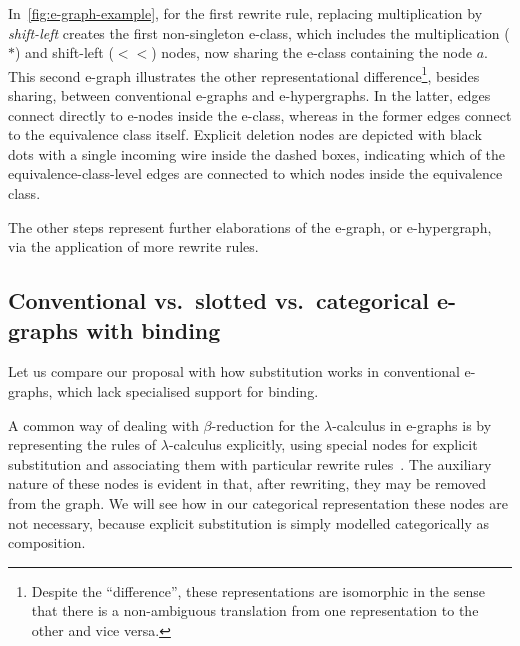 In~\autoref{fig:e-graph-example}, for the first rewrite rule, replacing multiplication by \emph{shift-left} creates the first non-singleton e-class, which includes the multiplication ($*$) and shift-left ($<\!\!<$) nodes, now sharing the e-class containing the node $a$.
This second e-graph illustrates the other representational difference\footnote{Despite the \enquote{difference}, these representations are isomorphic in the sense that there is a non-ambiguous translation from one representation to the other and vice versa.}, besides sharing, between conventional e-graphs and e-hypergraphs.
In the latter, edges connect directly to e-nodes inside the e-class, whereas in the former edges connect to the equivalence class itself.
Explicit deletion nodes are depicted with black dots with a single incoming wire
inside the dashed boxes, indicating which of the equivalence-class-level edges are connected to which nodes inside the equivalence class.

The other steps represent further elaborations of the e-graph, or e-hypergraph, via the application of more rewrite rules.

\subsection{Conventional vs.\ slotted vs.\ categorical e-graphs with binding}%
\label{sec:vs-e-graphs-with-binding}

Let us compare our proposal with how substitution works in conventional e-graphs, which lack specialised support for binding.

A common way of dealing with $\beta$-reduction for the $\lambda$-calculus in e-graphs is by representing the rules of $\lambda$-calculus explicitly, using special nodes for explicit substitution and associating them with particular rewrite rules~\cite{EggPaper,koehler2022sketchguided}.
The auxiliary nature of these nodes is evident in that, after rewriting, they may be removed from the graph.
We will see how in our categorical representation these nodes are not necessary, because explicit substitution is simply modelled categorically as composition.

